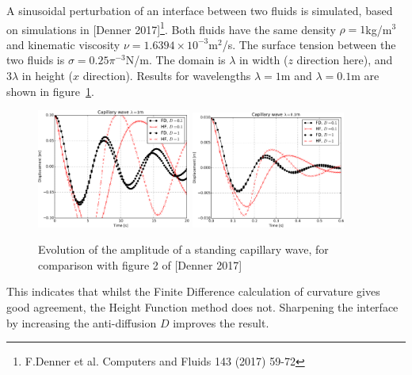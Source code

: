 \documentclass[12pt,a4paper]{article}
\begin{document}
A sinusoidal perturbation of an interface between two fluids is simulated, based on simulations in [Denner 2017]\footnote{F.Denner et al. Computers and Fluids 143 (2017) 59-72}. Both fluids have the same density $\rho=1$kg/m$^3$ and kinematic viscosity $\nu = 1.6394\times 10^{−3}$m$^2$/s. The surface tension between the two fluids is $\sigma=0.25\pi^{-3}$N/m. The domain is $\lambda$ in width ($z$ direction here), and $3\lambda$ in height ($x$ direction). Results for wavelengths $\lambda=1$m and $\lambda=0.1$m are shown in figure~\ref{fig:capillary}.
\begin{figure}[h]
\centering
\includegraphics[width=0.45\textwidth]{capillary_2.pdf}
\includegraphics[width=0.45\textwidth]{capillary_1.pdf}
\caption{Evolution of the amplitude of a standing capillary wave, for comparison with figure 2 of [Denner 2017]}
\label{fig:capillary}
\end{figure}
This indicates that whilst the Finite Difference calculation of curvature gives good agreement, the Height Function method does not. Sharpening the interface by increasing the anti-diffusion $D$ improves the result.
\end{document}
